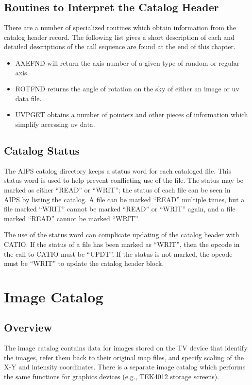 \subsection{Routines to Interpret the Catalog Header}
There are a number of specialized routines which obtain information
from the catalog header record.  The following list gives a short
description of each and detailed descriptions of the call sequence are
found at the end of this chapter.
\begin{itemize} %
\item AXEFND will return the axis number of a given type of random or
regular axis.
\item ROTFND returns the angle of rotation on the sky of either an image or
uv data file.
\item UVPGET obtains a number of pointers and other pieces of information
which simplify accessing uv data.
\end{itemize} %

\subsection{Catalog Status}
The AIPS catalog directory keeps a status word for each cataloged
file.  This status word is used to help prevent conflicting use of the
file.  The status may be marked as either ``READ'' or ``WRIT''; the status
of each file can be seen in AIPS by listing the catalog.  A file can
be marked ``READ'' multiple times, but a file marked ``WRIT'' cannot be
marked ``READ'' or ``WRIT'' again, and a file marked ``READ'' cannot be
marked ``WRIT''.

The use of the status word can complicate updating of the catalog
header with CATIO.  If the status of a file has been marked as ``WRIT'',
then the opcode in the call to CATIO must be ``UPDT''.  If the status is
not marked, the opcode must be ``WRIT'' to update the catalog header
block.
\section{Image Catalog }


\subsection{Overview}
The image catalog contains data for images stored on the TV device
that identify the images, refer them back to their original map files,
and specify scaling of the X-Y and intensity coordinates. There is a
separate image catalog which performs the same functions for graphics
devices (e.g., TEK4012 storage screens).

